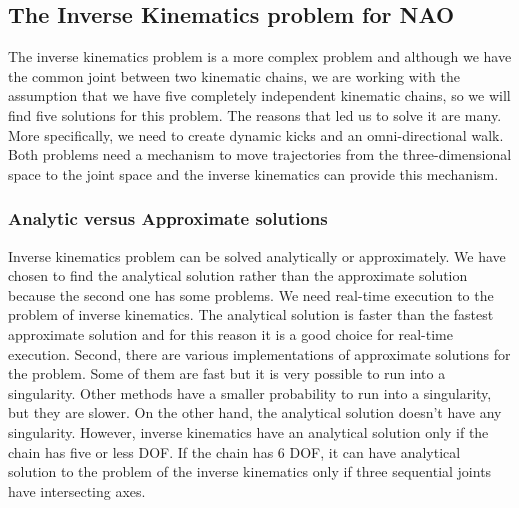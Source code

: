 \subsection{The Inverse Kinematics problem for NAO}
The inverse kinematics problem is a more complex problem and although we have the common joint between two kinematic chains, we are working with the assumption that we have five completely independent kinematic chains, so we will find five solutions for this problem. The reasons that led us to solve it are many. More specifically, we need to create dynamic kicks and an omni-directional walk. Both problems need a mechanism to move trajectories from the three-dimensional space to the joint space and the inverse kinematics can provide this mechanism.
\subsubsection*{Analytic versus Approximate solutions}
Inverse kinematics problem can be solved analytically or approximately. We have chosen to find the analytical solution rather than the approximate solution because the second one has some problems. We need real-time execution to the problem of inverse kinematics. The analytical solution is faster than the fastest approximate solution and for this reason it is a good choice for real-time execution. Second, there are various implementations of approximate solutions for the problem. Some of them are fast but it is very possible to run into a singularity. Other methods have a smaller probability to run into a singularity, but they are slower. On the other hand, the analytical solution doesn't have any singularity. However, inverse kinematics have an analytical solution only if the chain has five or less DOF. If the chain has 6 DOF, it can have analytical solution to the problem of the inverse kinematics only if three sequential joints have intersecting axes.

